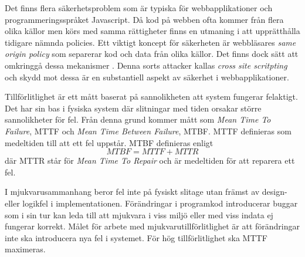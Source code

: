 Det finns flera säkerhetsproblem som är typiska för webbapplikationer och programmeringsspråket Javascript. Då kod på webben ofta kommer från flera olika källor men körs med samma rättigheter finns en utmaning i att upprätthålla tidigare nämnda policies. Ett viktigt koncept för säkerheten är webbläsares \textit{same origin policy} som separerar kod och data från olika källor. Det finns dock sätt att omkringgå dessa mekanismer \cite{Hejderup2017}. Denna sorts attacker kallas \textit{cross site scritpting} och skydd mot dessa är en substantiell aspekt av säkerhet i webbapplikationer.

Tillförlitlighet är ett mått baserat på sannolikheten att system fungerar felaktigt. Det har sin bas i fysiska system där slitningar med tiden orsakar större sannolikheter för fel. Från denna grund kommer mått som \textit{Mean Time To Failure}, MTTF och \textit{Mean Time Between Failure}, MTBF. MTTF definieras som medeltiden till att ett fel uppstår. MTBF definieras enligt $$MTBF = MTTF + MTTR$$ där MTTR står för \textit{Mean Time To Repair} och är medeltiden för att reparera ett fel. \cite{software-metrics}

I mjukvarusammanhang beror fel inte på fysiskt slitage utan främst av design- eller logikfel i implementationen. Förändringar i programkod introducerar buggar som i sin tur kan leda till att mjukvara i viss miljö eller med viss indata ej fungerar korrekt. Målet för arbete med mjukvarutillförlitlighet är att förändringar inte ska introducera nya fel i systemet. För hög tillförlitlighet ska MTTF maximeras. \cite{software-metrics}
